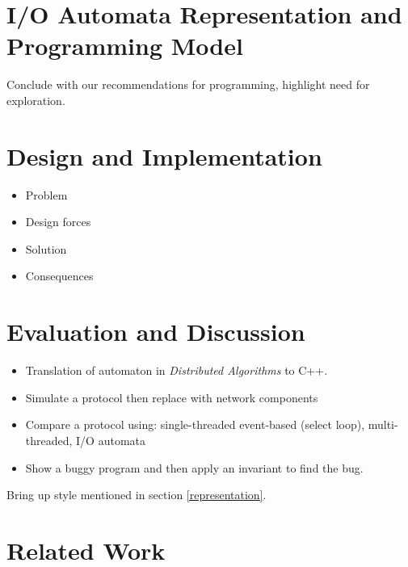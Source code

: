 \documentclass[letterpaper]{article}
\begin{document}

\section{I/O Automata Representation and Programming Model\label{representation}}

Conclude with our recommendations for programming, highlight need for exploration.

\section{Design and Implementation\label{design}}

\begin{itemize}
  \item Problem
  \item Design forces
  \item Solution
  \item Consequences
\end{itemize}

\section{Evaluation and Discussion\label{evaluation}}

\begin{itemize}
\item Translation of automaton in \emph{Distributed Algorithms} to C++.
\item Simulate a protocol then replace with network components
\item Compare a protocol using: single-threaded event-based (select loop), multi-threaded, I/O automata
\item Show a buggy program and then apply an invariant to find the bug.
\end{itemize}

Bring up style mentioned in section \ref{representation}.

\section{Related Work\label{related_work}}
\end{document}
